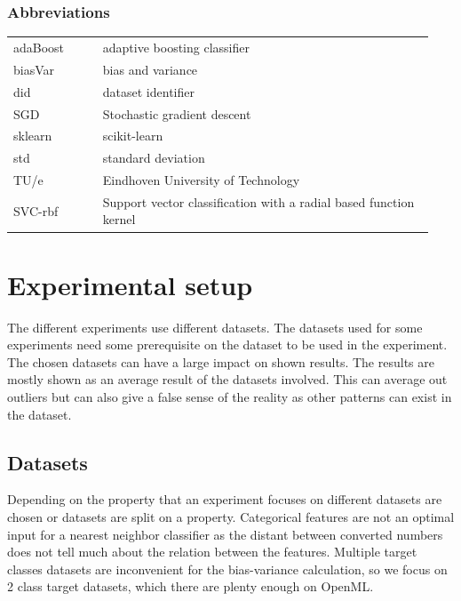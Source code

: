 \documentclass[a4paper,10pt]{article}
\begin{document}
\subsubsection{Abbreviations}
\begin{tabular}{ p{0.20\linewidth} p{0.7437\linewidth} }
	
	adaBoost & adaptive boosting classifier \\
	
	biasVar & bias and variance \\
	
	did & dataset identifier \\
	
	SGD & Stochastic gradient descent \\
	
	sklearn & scikit-learn \\
	
	std & standard deviation\\
	
	TU/e & Eindhoven University of Technology \\
	
	SVC-rbf & Support vector classification with a radial based function kernel
	
	
\end{tabular}

\newpage
\section{Experimental setup} \label{Chapter3}
The different experiments use different datasets. The datasets used for some experiments need some prerequisite on the dataset to be used in the experiment. The chosen datasets can have a large impact on shown results.
The results are mostly shown as an average result of the datasets involved. This can average out outliers but can also give a false sense of the reality as other patterns can exist in the dataset.


\subsection{Datasets} \label{description}
Depending on the property that an experiment focuses on different datasets are chosen or datasets are split on a property. Categorical features are not an optimal input for a nearest neighbor classifier as the distant between converted numbers does not tell much about the relation between the features. Multiple target classes datasets are inconvenient for the bias-variance calculation, so we focus on 2 class target datasets, which there are plenty enough on OpenML. 
\end{document}
